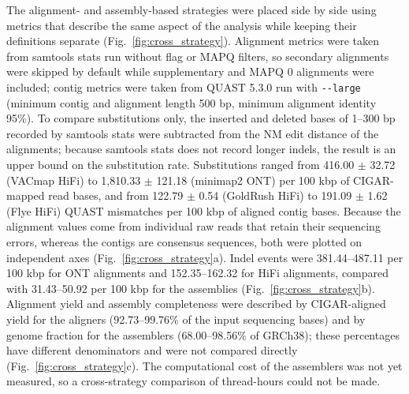\documentclass[12pt, letterpaper]{article}
\begin{document}
The alignment- and assembly-based strategies were placed side by side using metrics that describe the same aspect of the analysis while keeping their definitions separate (Fig.~\ref{fig:cross_strategy}). Alignment metrics were taken from samtools stats run without flag or MAPQ filters, so secondary alignments were skipped by default while supplementary and MAPQ 0 alignments were included; contig metrics were taken from QUAST 5.3.0 run with \texttt{-{}-large} (minimum contig and alignment length 500 bp, minimum alignment identity 95\%). To compare substitutions only, the inserted and deleted bases of 1--300 bp recorded by samtools stats were subtracted from the NM edit distance of the alignments; because samtools stats does not record longer indels, the result is an upper bound on the substitution rate. Substitutions ranged from 416.00 $\pm$ 32.72 (VACmap HiFi) to 1,810.33 $\pm$ 121.18 (minimap2 ONT) per 100 kbp of CIGAR-mapped read bases, and from 122.79 $\pm$ 0.54 (GoldRush HiFi) to 191.09 $\pm$ 1.62 (Flye HiFi) QUAST mismatches per 100 kbp of aligned contig bases. Because the alignment values come from individual raw reads that retain their sequencing errors, whereas the contigs are consensus sequences, both were plotted on independent axes (Fig.~\ref{fig:cross_strategy}a). Indel events were 381.44--487.11 per 100 kbp for ONT alignments and 152.35--162.32 for HiFi alignments, compared with 31.43--50.92 per 100 kbp for the assemblies (Fig.~\ref{fig:cross_strategy}b). Alignment yield and assembly completeness were described by CIGAR-aligned yield for the aligners (92.73--99.76\% of the input sequencing bases) and by genome fraction for the assemblers (68.00--98.56\% of GRCh38); these percentages have different denominators and were not compared directly (Fig.~\ref{fig:cross_strategy}c). The computational cost of the assemblers was not yet measured, so a cross-strategy comparison of thread-hours could not be made.
\end{document}
